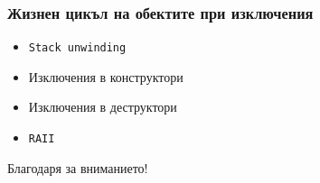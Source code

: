 \documentclass{beamer}
\begin{document}
\begin{frame}[fragile]
  \frametitle{Жизнен цикъл на обектите при изключения}

  \begin{itemize}
    \item \texttt{Stack unwinding}
    \item Изключения в конструктори
    \item Изключения в деструктори
    \item \texttt{RAII}
  \end{itemize}
\end{frame}


\begin{frame}
\centerline{Благодаря за вниманието!}
\end{frame}
\end{document}
